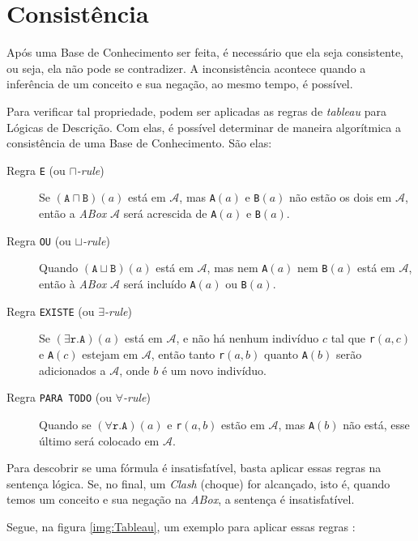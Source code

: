 \section{Consistência}

Após uma Base de Conhecimento ser feita, é necessário que ela seja consistente, ou seja, ela não pode se contradizer. A inconsistência acontece quando a inferência de um conceito e sua negação, ao mesmo tempo, é possível. 

Para verificar tal propriedade, podem ser aplicadas as regras de \textit{tableau} para Lógicas de Descrição. Com elas, é possível determinar de maneira algorítmica a consistência de uma Base de Conhecimento. São elas:

\begin{description}
	\item[Regra \texttt{E} (ou \textit{$ \sqcap $-rule})] Se $(\texttt{A} \sqcap \texttt{B})(a)$ está em $ \mathcal{A} $, mas \texttt{A}$ (a) $ e \texttt{B}$ (a) $ não estão os dois em $ \mathcal{A} $, então a \textit{ABox} $ \mathcal{A} $ será acrescida de \texttt{A}$ (a) $ e \texttt{B}$ (a) $.
	\item[Regra \texttt{OU} (ou \textit{$ \sqcup $-rule})] Quando $(\texttt{A} \sqcup \texttt{B})(a)$ está em $ \mathcal{A} $, mas nem \texttt{A}$ (a) $ nem \texttt{B}$ (a) $ está em $ \mathcal{A} $, então à \textit{ABox} $ \mathcal{A} $ será incluído \texttt{A}$ (a) $ ou \texttt{B}$ (a) $.
	\item[Regra \texttt{EXISTE} (ou \textit{$ \exists $-rule})] Se $(\exists \texttt{r.A})(a)$ está em $ \mathcal{A} $, e não há nenhum indivíduo $ c $ tal que \texttt{r}$ (a,c) $ e \texttt{A}$ (c) $ estejam em $ \mathcal{A} $, então tanto \texttt{r}$ (a,b) $ quanto \texttt{A}$ (b) $ serão adicionados a $ \mathcal{A} $, onde $ b $ é um novo indivíduo.
	\item[Regra \texttt{PARA TODO} (ou \textit{$ \forall $-rule})] Quando se $(\forall \texttt{r.A})(a)$ e \texttt{r}$ (a,b) $ estão em $ \mathcal{A} $, mas \texttt{A}$ (b) $ não está, esse último será colocado em $ \mathcal{A} $.  
\end{description}

Para descobrir se uma fórmula é insatisfatível, basta aplicar essas regras na sentença lógica. Se, no final, um \textit{Clash} (choque) for alcançado, isto é, quando temos um conceito e sua negação na \textit{ABox}, a sentença é insatisfatível.

Segue, na figura \ref{img:Tableau}, um exemplo para aplicar essas regras \citep{logicaKoubarakis}:


